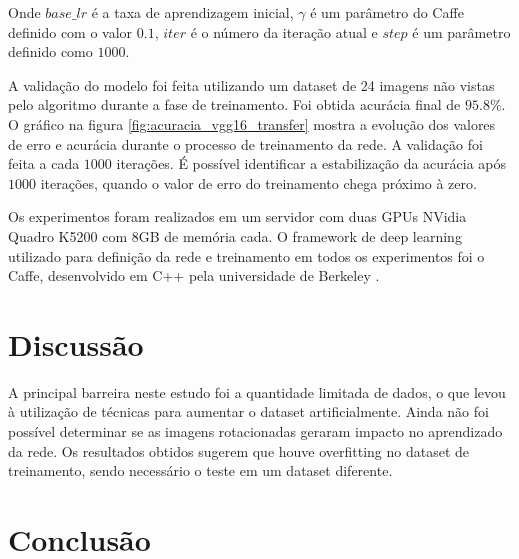 \documentclass[conference]{IEEEtran}
\begin{document}
  Onde $base\_lr$ é a taxa de aprendizagem inicial, $\gamma$ é um parâmetro do Caffe definido com o valor $0.1$, $iter$ é o número da iteração atual e $step$ é um parâmetro definido como $1000$.

  A validação do modelo foi feita utilizando um dataset de 24 imagens não vistas pelo algoritmo durante a fase de treinamento. Foi obtida acurácia final de $95.8\%$. O gráfico na figura \ref{fig:acuracia_vgg16_transfer} mostra a evolução dos valores de erro e acurácia durante o processo de treinamento da rede. A validação foi feita a cada $1000$ iterações. É possível identificar a estabilização da acurácia após $1000$ iterações, quando o valor de erro do treinamento chega próximo à zero.

  Os experimentos foram realizados em um servidor com duas GPUs NVidia Quadro K5200 com 8GB de memória cada. O framework de deep learning utilizado para definição da rede e treinamento em todos os experimentos foi o Caffe, desenvolvido em C++ pela universidade de Berkeley \cite{jia2014caffe}.

\section{Discussão}


A principal barreira neste estudo foi a quantidade limitada de dados, o que levou à utilização de técnicas para aumentar o dataset artificialmente. Ainda não foi possível determinar se as imagens rotacionadas geraram impacto no aprendizado da rede. Os resultados obtidos sugerem que houve overfitting no dataset de treinamento, sendo necessário o teste em um dataset diferente. %


\section{Conclusão}





\end{document}

